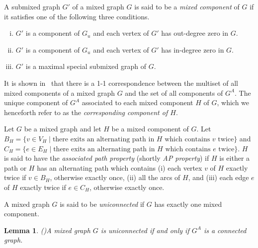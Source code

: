 \documentclass[12pt]{article}
\numberwithin{equation}{section}
\newtheorem{defn}{Definition}[section]
\newtheorem{lemma}{Lemma}[section]
\begin{document}
	  A submixed graph $G'$ of a mixed graph $G$ is said to be a \textit{mixed component} of $G$ if it satisfies one of the following three conditions.
		\begin{enumerate}[(i)]
			\item $G'$ is a component of $G_u$ and each vertex of $G'$ has out-degree zero in $G$.
			\item $G'$ is a component of $G_u$ and each vertex of $G'$ has in-degree zero in $G$.
			\item $G'$ is a maximal special submixed graph of $G$.
		\end{enumerate}
	
	
	It is shown in~\cite[Theorem~6.1]{Kalaimatrices1} that  there is a 1-1 correspondence between the multiset of all mixed components of a mixed graph $G$ and the set of all components of $G^A$. The unique component of $G^A$ associated to each mixed component $H$ of $G$, which we henceforth refer to as the \textit{corresponding component of $H$}.




	Let $G$ be a mixed graph and let $H$ be a mixed component of $G$. Let $B_H=\{v\in V_H\mid \text{there exits an alternating path in }H\text{ which contains }v\text{ twice}\}$ and $C_H=\{e\in E_H\mid \text{there exits an alternating path in }H\text{ which contains }e\text{ twice}\}$.
	$H$ is said to have the \textit{associated path property} (shortly \textit{AP property}) if $H$ is either a path or $H$ has an alternating path which contains 
	(i) each vertex $v$ of $H$ exactly twice if $v\in B_H$, otherwise exactly once,
	(ii) all the arcs of $H$,  and
	(iii) each edge $e$ of $H$ exactly twice if $e\in C_H$, otherwise exactly once. 


		A mixed graph $G$ is said to be \textit{uniconnected} if $G$ has exactly one mixed component.

	\begin{lemma}(\cite[Lemma~6.2]{Kalaimatrices1})\label{uniconnected connected}
		A mixed graph $G$ is uniconnected if and only if $G^A$ is a connected graph.
	\end{lemma}
\end{document}
